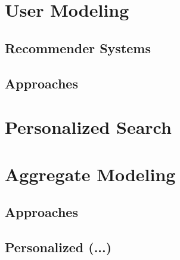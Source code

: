 \section{User Modeling}

\subsection{Recommender Systems}
\subsection{Approaches}

\section{Personalized Search}

\section{Aggregate Modeling}

\subsection{Approaches}
\subsection{Personalized (...)}


